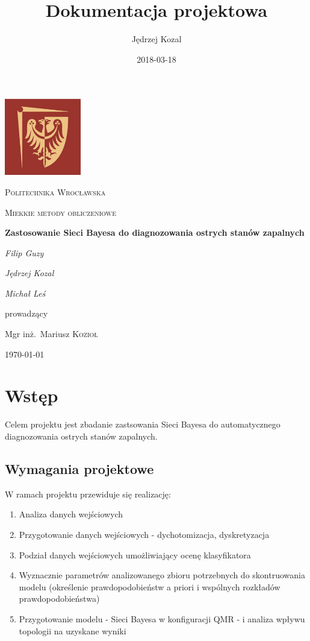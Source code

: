 \documentclass{article}
\title{Dokumentacja projektowa}
\date{2018-03-18}
\author{Jędrzej Kozal}
\begin{document}
\begin{titlepage}
	\centering
	\includegraphics[width=0.25\textwidth]{logo_pol_wroclaw.png}\par\vspace{1cm}
	{\scshape\LARGE Politechnika Wrocławska \par}
	\vspace{1cm}
	{\scshape\Large Miekkie metody obliczeniowe\par}
	\vspace{1.5cm}
	{\huge\bfseries Zastosowanie Sieci Bayesa do diagnozowania ostrych stanów zapalnych \par}
	\vspace{2cm}
	{\Large\itshape Filip Guzy\par}
	{\Large\itshape Jędrzej Kozal\par}
	{\Large\itshape Michał Leś\par}

	\vfill
	prowadzący\par
	Mgr inż.~Mariusz \textsc{Kozioł}

	\vfill

	{\large \today\par}
\end{titlepage}

\tableofcontents
\newpage


\section{Wstęp}

Celem projektu jest zbadanie zastsowania Sieci Bayesa do automatycznego diagnozowania ostrych stanów zapalnych. 

\subsection{Wymagania projektowe}
W ramach projektu przewiduje się realizację:
\begin{enumerate}
	\item Analiza danych wejściowych
	\item Przygotowanie danych wejściowych - dychotomizacja, dyskretyzacja
	\item Podział danych wejściowych umożliwiający ocenę klasyfikatora
	\item Wyznacznie parametrów analizowanego zbioru potrzebnych do skontruowania modelu (określenie prawdopodobieństw a priori i wspólnych rozkładów prawdopodobieństwa)
	\item Przygotowanie modelu - Sieci Bayesa w konfiguracji QMR - i analiza wpływu topologii na uzyskane wyniki	
\end{enumerate}
\end{document}
